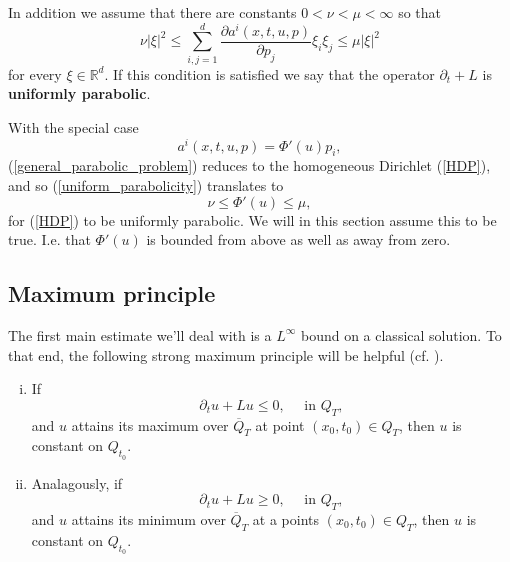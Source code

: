 \documentclass[11pt, a4paper]{article}
\begin{document}
In addition we assume that there are constants $0 < \nu < \mu < \infty $ so that
\begin{equation}
\label{uniform_parabolicity}
\nu |\xi|^2 \leq \sum_{i,j=1}^d \frac{\partial a^i(x,t,u,p)}{\partial p_j}\xi_i \xi_j \leq \mu |\xi|^2 
\end{equation}
for every $\xi \in \mathbb{R}^d$. If this condition is satisfied we say that the operator $\partial_t + L$ is \textbf{uniformly parabolic}.

With the special case
\begin{equation*}
a^i(x,t,u,p) = \Phi'(u)p_i,
\end{equation*}
(\ref{general_parabolic_problem}) reduces to the homogeneous Dirichlet (\ref{HDP}),
and so (\ref{uniform_parabolicity}) translates to
\begin{equation}
\label{uniform_parabGPME}
\nu \leq \Phi'(u) \leq \mu,
\end{equation}
for (\ref{HDP}) to be uniformly parabolic.
We will in this section assume this to be true. I.e. that $\Phi'(u)$ is bounded from above as well as away from zero.
\subsection{Maximum principle}
The first main estimate we'll deal with is a $L^\infty$ bound on a classical solution. To that end, the following strong maximum principle will be helpful (cf. \citep[p. 396]{evans}).

\begin{theorem}
\begin{enumerate}[i)]
	Suppose $\Omega$ is connected, and $u\in C^{2,1}(Q_T)\cap C(\overline{Q}_T)$, and $\partial_t + L$ is uniformly parabolic, then:
	\item If
	\begin{equation*}
		\partial_tu + Lu \leq 0, \quad \text{ in } Q_T, 
	\end{equation*}
	and $u$ attains its maximum over $\overline{Q}_T$ at point $(x_0,t_0)\in Q_T$, then
	$u$ is constant on $Q_{t_0}$.
	
	\item Analagously, if
	\begin{equation*}
		\partial_tu + Lu \geq 0, \quad \text{ in } Q_T, 
	\end{equation*}
	and $u$ attains its minimum over $\overline{Q}_T$ at a points  $(x_0,t_0) \in Q_T$, then $u$ is constant on $Q_{t_0}$.
\end{enumerate}
\end{theorem}
\end{document}
